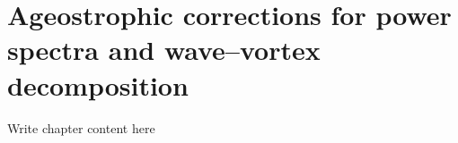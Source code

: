 \chapter{Ageostrophic corrections for power spectra and wave--vortex decomposition} 
Write chapter content here